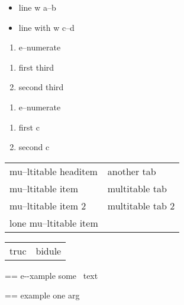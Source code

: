 \documentclass{book}
\makeatletter
\newenvironment{Texinfopreformatted}{%
  \par\GNUTobeylines\obeyspaces\frenchspacing\parskip=\z@\parindent=\z@}{}
{\catcode`\^^M=13 \gdef\GNUTobeylines{\catcode`\^^M=13 \def^^M{\null\par}}}
\newenvironment{Texinfoindented}{\begin{list}{}{}\item\relax}{\end{list}}
\renewcommand{\_}{\Texinfounderscore\discretionary{}{}{}}
\makeatother
\begin{document}
\begin{itemize}[label=\hbox{} on a line]
\item line w a--b
\item line with w c--d
\end{itemize}

\begin{enumerate}[start=1]
\item e--numerate
\end{enumerate}

\begin{enumerate}[start=3]
\item first third
\item second third
\end{enumerate}

\begin{enumerate}[label=\alph*.]
\item e--numerate
\end{enumerate}

\begin{enumerate}[label=\alph*.,start=3]
\item first c
\item second c
\end{enumerate}

\begin{tabular}{m{} m{}}%
mu--ltitable headitem &another tab\\
mu--ltitable item &multitable tab\\
mu--ltitable item 2 &multitable tab 2
\index[cp]{index entry within multitable@index entry within multitable}%
\\
lone mu--ltitable item&\\
\end{tabular}%

\begin{tabular}{m{} m{}}%
truc &bidule\\
\end{tabular}%

\begin{Texinfoindented}
\begin{Texinfopreformatted}%
\ttfamily e{-}{-}xample  some
\   text
\end{Texinfopreformatted}
\end{Texinfoindented}

\begin{Texinfoindented}
\begin{Texinfopreformatted}%
\ttfamily example one arg
\end{Texinfopreformatted}
\end{Texinfoindented}
\end{document}
